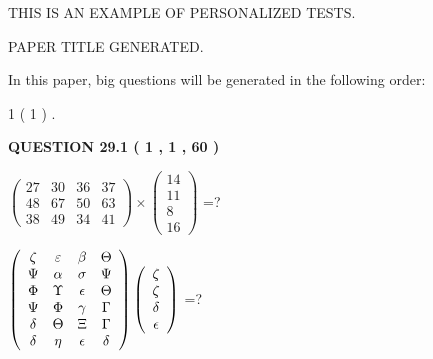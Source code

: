 \documentclass[12pt]{article}
\begin{document}
   
   
   
   
   
 \vspace{0.2in}
{\Huge  THIS IS AN EXAMPLE OF}
{\Huge  PERSONALIZED TESTS. }
   
   
 PAPER TITLE GENERATED.
   
   
   
\vspace{0.2in}
   
In this paper, big questions will be generated in the following order: 
   
   
   1 ( 1 )
 .
  
\vspace{0.2in}
  
{\textbf{\Large{QUESTION
29.1 
 ( 1 , 1 , 60 )
}}}
  
  
 
$ \left( \begin{array}{ccccccccc}
 27  & 
 30  & 
 36  & 
 37  \\ 
 48  & 
 67  & 
 50  & 
 63  \\ 
 38  & 
 49  & 
 34  & 
 41
\end{array}\right) \times
\left( \begin{array}{c}
 14  \\ 
 11  \\ 
 8  \\ 
 16
\end{array}\right) $ =?
 
 
$  %
 \left( \begin{array}
 {
 c
 c
 c
 c
 }
                    \zeta & 
 \varepsilon & 
 \beta & 
 \Theta \\ 
 \Psi & 
 \alpha & 
 \sigma & 
 \Psi \\ 
 \Phi & 
 \Upsilon & 
 \epsilon & 
 \Theta \\ 
 \Psi & 
 \Phi & 
 \gamma & 
 \Gamma \\ 
 \delta & 
 \Theta & 
                    \Xi & 
 \Gamma \\ 
 \delta & 
 \eta & 
 \epsilon & 
 \delta
 \end{array} \right)
 \left( \begin{array}
 {
 c
 }
                    \zeta \\ 
                    \zeta \\ 
 \delta \\ 
 \epsilon
 \end{array} \right)
$ =?
 
 
 
\end{document}
